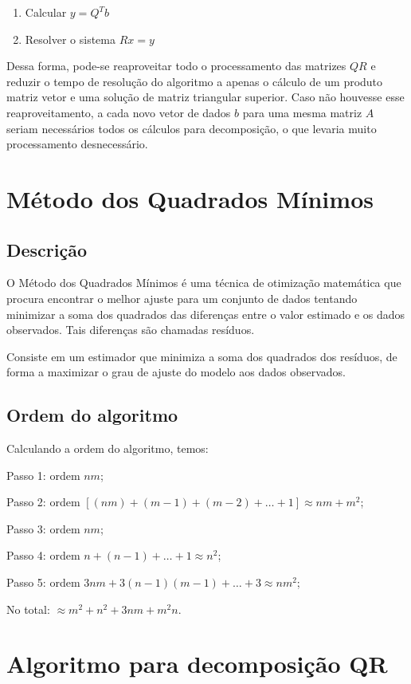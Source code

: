 	\begin{enumerate}
	\item Calcular $y = Q^Tb$
	\item Resolver o sistema $Rx = y$
	\end{enumerate}
	
	Dessa forma, pode-se reaproveitar todo o processamento das matrizes $QR$ e reduzir o tempo de resolução do algoritmo
	a apenas o cálculo de um produto matriz vetor e uma solução de matriz triangular superior.
	Caso não houvesse esse reaproveitamento, a cada novo vetor de dados $b$ para uma mesma matriz $A$ seriam necessários todos os cálculos para decomposição, o que levaria muito processamento desnecessário.
\chapter{Método dos Quadrados Mínimos}

	\section{Descrição}
	O Método dos Quadrados Mínimos é uma técnica de otimização matemática que procura encontrar o melhor ajuste para um 
	conjunto de dados tentando minimizar a soma dos quadrados das diferenças entre o valor estimado e os dados observados.
	Tais diferenças são chamadas resíduos.
	
	
	Consiste em um estimador que minimiza a soma dos quadrados dos resíduos, de forma a maximizar o grau de ajuste do modelo aos dados observados.\cite{wikipedia}
	
	\section{Ordem do algoritmo}
	Calculando a ordem do algoritmo, temos:
	
	Passo 1: ordem $nm$;

	Passo 2: ordem $[(nm)+(m-1)+(m-2)+\ldots +1] \approx nm + m^2$;
	
	Passo 3: ordem $nm$;
	
	Passo 4: ordem $n + (n-1) + \ldots + 1 \approx n^2$;
	
	Passo 5: ordem $3nm + 3(n-1)(m-1) + \ldots + 3 \approx nm^2$;
	
	No total: $\approx m^2+n^2+3nm+m^2 n$.



\chapter{Algoritmo para decomposição QR}


